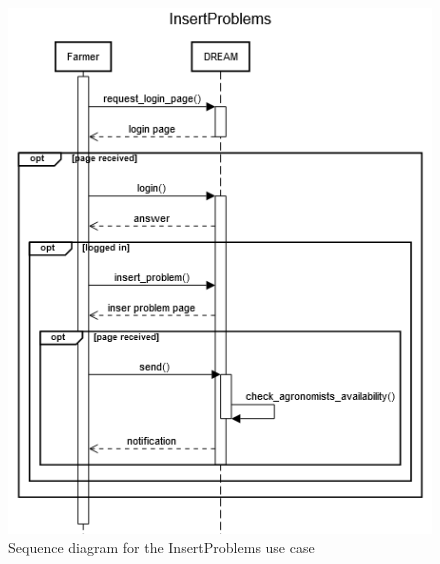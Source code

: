 \documentclass{article}
\begin{document}
\begin{figure}[H]
    \centering
    \includegraphics[scale=0.75]{sequence_diagrams/InsertProblems}
    \caption{Sequence diagram for the InsertProblems use case}
\end{figure}
\end{document}

